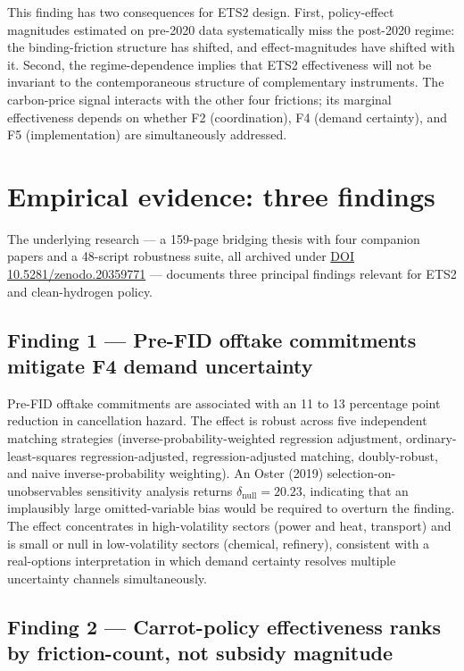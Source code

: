 \documentclass[11pt,a4paper]{article}
\begin{document}
This finding has two consequences for ETS2 design. First, policy-effect magnitudes estimated on pre-2020 data systematically miss the post-2020 regime: the binding-friction structure has shifted, and effect-magnitudes have shifted with it. Second, the regime-dependence implies that ETS2 effectiveness will not be invariant to the contemporaneous structure of complementary instruments. The carbon-price signal interacts with the other four frictions; its marginal effectiveness depends on whether F2 (coordination), F4 (demand certainty), and F5 (implementation) are simultaneously addressed.

\section{Empirical evidence: three findings}

The underlying research --- a 159-page bridging thesis with four companion papers and a 48-script robustness suite, all archived under \href{https://doi.org/10.5281/zenodo.20359771}{DOI 10.5281/zenodo.20359771} --- documents three principal findings relevant for ETS2 and clean-hydrogen policy.

\subsection*{Finding 1 --- Pre-FID offtake commitments mitigate F4 demand uncertainty}

Pre-FID offtake commitments are associated with an 11 to 13 percentage point reduction in cancellation hazard. The effect is robust across five independent matching strategies (inverse-probability-weighted regression adjustment, ordinary-least-squares regression-adjusted, regression-adjusted matching, doubly-robust, and naive inverse-probability weighting). An Oster (2019) selection-on-unobservables sensitivity analysis returns $\delta_{\text{null}} = 20.23$, indicating that an implausibly large omitted-variable bias would be required to overturn the finding. The effect concentrates in high-volatility sectors (power and heat, transport) and is small or null in low-volatility sectors (chemical, refinery), consistent with a real-options interpretation in which demand certainty resolves multiple uncertainty channels simultaneously.

\subsection*{Finding 2 --- Carrot-policy effectiveness ranks by friction-count, not subsidy magnitude}
\end{document}
